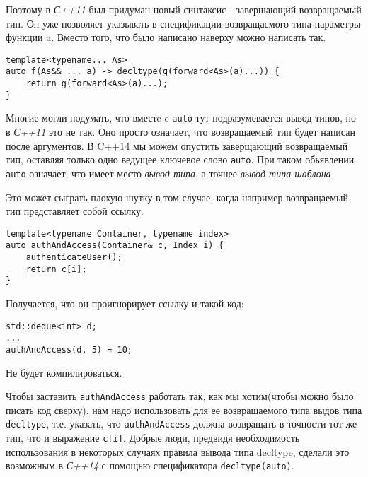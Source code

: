 		Поэтому в \textit{С++11} был придуман новый синтаксис - завершающий возвращаемый тип. Он уже позволяет указывать в спецификации возвращаемого типа параметры функции a. Вместо того, что было написано наверху можно написать так.
		
\begin{verbatim}
template<typename... As>
auto f(As&& ... a) -> decltype(g(forward<As>(a)...)) {
	return g(forward<As>(a)...);
}
\end{verbatim}
		
		Многие могли подумать, что вместe c \texttt{auto} тут подразумевается вывод типов, но в \textit{С++11} это не так. Оно просто означает, что возвращаемый тип будет написан после аргументов. В C++14 мы можем опустить заверщающий возвращаемый тип, оставляя только одно ведущее ключевое слово \texttt{auto}. При таком обьявлении \texttt{auto} означает, что имеет место \textit{вывод типа}, а точнее \textit{вывод типа шаблона}
		
		Это может сыграть плохую шутку в том случае, когда например возвращаемый тип представляет собой ссылку.
\begin{verbatim}
template<typename Container, typename index>
auto authAndAccess(Container& c, Index i) {
	authenticateUser();
	return c[i];
}
\end{verbatim}
		Получается, что он проигнорирует ссылку и такой код:
\begin{verbatim}
std::deque<int> d;
...
authAndAccess(d, 5) = 10;
\end{verbatim}
		Не будет компилироваться.
		
		Чтобы заставить \texttt{authAndAccess} работать так, как мы хотим(чтобы можно было писать код сверху), нам надо использовать для ее возвращаемого типа выдов типа \texttt{decltype}, т.е. указать, что \texttt{authAndAccess} должна возвращать в точности тот же тип, что и выражение \texttt{c[i]}. Добрые люди, предвидя необходимость использования в некоторых случаях правила вывода типа decltype, сделали это возможным в \textit{С++14} с помощью спецификатора \texttt{decltype(auto)}.
		
